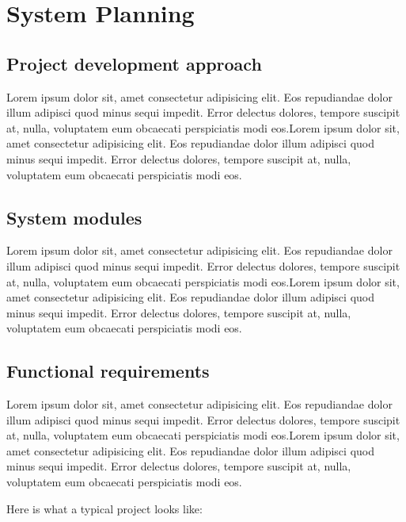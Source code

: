 \chapter{System Planning}\label{System Planning}
\section{Project development approach}
Lorem ipsum dolor sit, amet consectetur adipisicing elit. Eos repudiandae dolor illum adipisci quod minus sequi impedit. Error delectus dolores, tempore suscipit at, nulla, voluptatem eum obcaecati perspiciatis modi eos.Lorem ipsum dolor sit, amet consectetur adipisicing elit. Eos repudiandae dolor illum adipisci quod minus sequi impedit. Error delectus dolores, tempore suscipit at, nulla, voluptatem eum obcaecati perspiciatis modi eos.
\section{System modules}
Lorem ipsum dolor sit, amet consectetur adipisicing elit. Eos repudiandae dolor illum adipisci quod minus sequi impedit. Error delectus dolores, tempore suscipit at, nulla, voluptatem eum obcaecati perspiciatis modi eos.Lorem ipsum dolor sit, amet consectetur adipisicing elit. Eos repudiandae dolor illum adipisci quod minus sequi impedit. Error delectus dolores, tempore suscipit at, nulla, voluptatem eum obcaecati perspiciatis modi eos.
\section{Functional requirements}

Lorem ipsum dolor sit, amet consectetur adipisicing elit. Eos repudiandae dolor illum adipisci quod minus sequi impedit. Error delectus dolores, tempore suscipit at, nulla, voluptatem eum obcaecati perspiciatis modi eos.Lorem ipsum dolor sit, amet consectetur adipisicing elit. Eos repudiandae dolor illum adipisci quod minus sequi impedit. Error delectus dolores, tempore suscipit at, nulla, voluptatem eum obcaecati perspiciatis modi eos. 

 Here is what a typical project looks like:

